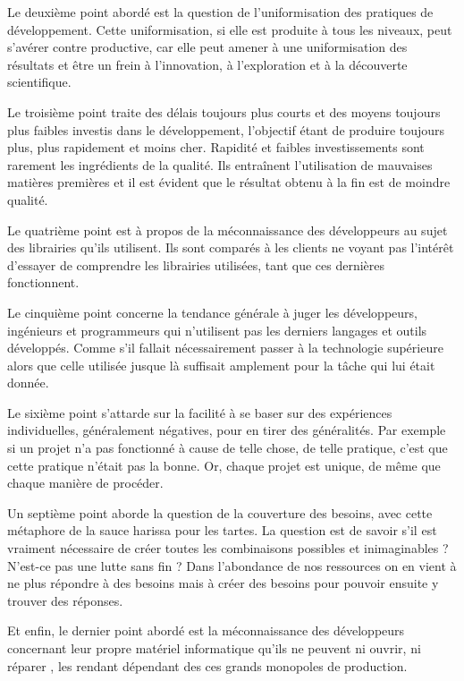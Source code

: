 \documentclass[a4paper,12pt,twoside]{book}
\begin{document}
Le deuxième point abordé est la question de l'uniformisation des pratiques de développement. Cette uniformisation, si elle est produite à tous les niveaux, peut s'avérer contre productive, car elle peut amener à une uniformisation des résultats et être un frein à l'innovation, à l'exploration et à la découverte scientifique.

Le troisième point traite des délais toujours plus courts et des moyens toujours plus faibles investis dans le développement, l'objectif étant de produire toujours plus, plus rapidement et moins cher. Rapidité et faibles investissements sont rarement les ingrédients de la qualité. Ils entraînent l'utilisation de mauvaises matières premières et il est évident que le résultat obtenu à la fin est de moindre qualité.

Le quatrième point est à propos de la méconnaissance des développeurs au sujet des librairies qu'ils utilisent. Ils sont comparés à les clients ne voyant pas l'intérêt d'essayer de comprendre les librairies utilisées, tant que ces dernières fonctionnent.

Le cinquième point concerne la tendance générale à juger les développeurs, ingénieurs et programmeurs qui n'utilisent pas les derniers langages et outils développés. Comme s'il fallait nécessairement passer à la technologie supérieure alors que celle utilisée jusque là suffisait amplement pour la tâche qui lui était donnée.

Le sixième point s'attarde sur la facilité à se baser sur des expériences individuelles, généralement négatives, pour en tirer des généralités. Par exemple si un projet n'a pas fonctionné à cause de telle chose, de telle pratique, c'est que cette pratique n'était pas la bonne. Or, chaque projet est unique, de même que chaque manière de procéder.

Un septième point aborde la question de la couverture des besoins, avec cette métaphore de la sauce harissa pour les tartes. La question est de savoir s'il est vraiment nécessaire de créer toutes les combinaisons possibles et inimaginables ? N'est-ce pas une lutte sans fin ? Dans l'abondance de nos ressources on en vient à ne plus répondre à des besoins mais à créer des besoins pour pouvoir ensuite y trouver des réponses.

Et enfin, le dernier point abordé est la méconnaissance des développeurs concernant leur propre matériel informatique qu'ils ne peuvent \og ni ouvrir, ni réparer \fg, les rendant dépendant des ces grands monopoles de production.\\
\end{document}
